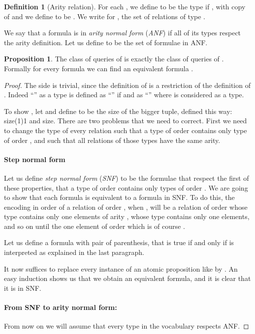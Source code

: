 \documentclass[a4paper,12pt]{article}
\newcommand{\emphdex}[1]{\index{#1}\emph{#1}}
\theoremstyle{definition}
\newtheorem{definition}[theorem]{Definition}
\newtheorem{proposition}[theorem]{Proposition}
\begin{document}
\begin{definition}[Arity relation]
  For each , we define \emphdex{}to be the type
   if , with  copy of 
  and we define  to be . We write  for
  ,   the set of relations of type .

  We say that a formula is in \emphdex{arity normal form}
  (\emphdex{ANF}) if all of its types respect the arity
  definition. Let us define  to be the set of formulae in
  ANF.
\end{definition}

\begin{proposition}
  The class of queries of  is exactly the class of
  queries of . Formally for every formula
   we can find an equivalent formula
  .
\end{proposition}
\begin{proof} The side  is trivial, since the definition of
   is a restriction of the definition of . Indeed ``'' as
  a type is defined as ``'' if  and as
  ``'' where  is considered as a
  type.

  To show , let  and define  to be
  the size of the bigger tuple, defined this way: size(1)1 and
  size. There are two problems that we need to
  correct. First we need to change the type of every relation such
  that a type of order  contains only type of order , and such
  that all relations of those types have the same arity.

  \paragraph{Step normal form}Let us define \emphdex{step normal form}
  (\emphdex{SNF}) to be the formulae that respect the first of these
  properties, that a type of order  contains only types of order
  .  We are going to show that each formula is equivalent to a
  formula in SNF. To do this, the encoding in order  of a relation
   of order , when , will be a relation of order
   whose type contains only one elements of arity , whose type
  contains only one elements, and so on until the one element of order
   which is of course .

  Let us define a formula  with  pair of parenthesis, that
  is true if and only if  is interpreted  as explained in the
  last paragraph.
  
It now suffices to replace every instance of an atomic proposition
like  by
.  An
easy induction shows us that we obtain an equivalent formula, and it
is clear that it is in SNF.

\paragraph{From SNF to arity normal form:}
From now on we will assume that every type in the vocabulary respects
ANF.


\end{proof}
\end{document}

